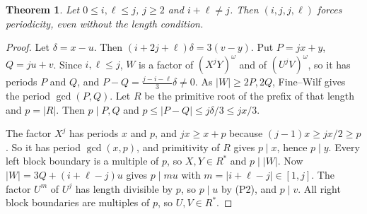 \documentclass[10pt]{article}
\newtheorem{theorem}{Theorem}
\theoremstyle{remark}\newtheorem*{remark}{Remark}
\begin{document}
\begin{theorem}\label{ijjl}
Let \(0\le i,\ell\le j\), \(j\ge2\) and \(i+\ell\ne j\). Then \((i,j,j,\ell)\) forces periodicity, even without the length condition.
\end{theorem}
\begin{proof}
Let \(\delta=x-u\). Then \((i+2j+\ell)\delta=3(v-y)\). Put \(P=jx+y\), \(Q=ju+v\). Since \(i,\ell\le j\), \(W\) is a factor of \((X^jY)^\omega\) and of \((U^jV)^\omega\), so it has periods \(P\) and \(Q\), and \(P-Q=\tfrac{j-i-\ell}{3}\delta\ne0\). As \(|W|\ge2P,2Q\), Fine--Wilf gives the period \(\gcd(P,Q)\). Let \(R\) be the primitive root of the prefix of that length and \(p=|R|\). Then \(p\mid P,Q\) and \(p\le|P-Q|\le j\delta/3\le jx/3\).

The factor \(X^j\) has periods \(x\) and \(p\), and \(jx\ge x+p\) because \((j-1)x\ge jx/2\ge p\). So it has period \(\gcd(x,p)\), and primitivity of \(R\) gives \(p\mid x\), hence \(p\mid y\). Every left block boundary is a multiple of \(p\), so \(X,Y\in R^*\) and \(p\mid|W|\). Now \(|W|=3Q+(i+\ell-j)u\) gives \(p\mid mu\) with \(m=|i+\ell-j|\in[1,j]\). The factor \(U^m\) of \(U^j\) has length divisible by \(p\), so \(p\mid u\) by (P2), and \(p\mid v\). All right block boundaries are multiples of \(p\), so \(U,V\in R^*\).
\end{proof}
\end{document}
